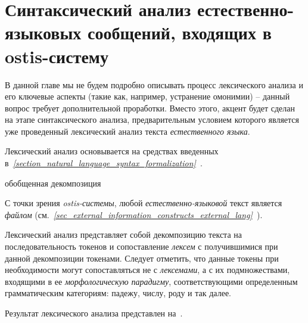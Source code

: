 \section{Синтаксический анализ естественно-языковых сообщений, входящих в ostis-систему}
\label{section_natural_language_messages_syntax_analysis}

В данной главе мы не будем подробно описывать процесс лексического анализа и его ключевые аспекты (такие как, например, устранение омонимии) – данный вопрос требует дополнительной проработки.
Вместо этого, акцент будет сделан на этапе синтаксического анализа, предварительным условием которого является уже проведенный лексический анализ текста \textit{естественного языка}.

Лексический анализ основывается на средствах введенных в~\textit{\ref{section_natural_language_syntax_formalization}~}.

\begin{SCn}

    \begin{scnrelfromset}{обобщенная декомпозиция}
    \end{scnrelfromset}

\end{SCn}

С точки зрения \textit{ostis-системы}, любой \textit{естественно-языковой} текст является \textit{файлом} (см.~\textit{\ref{sec_external_information_constructs_external_lang}~}).

Лексический анализ представляет собой декомпозицию текста на последовательность токенов и сопоставление \textit{лексем} с получившимися при данной декомпозиции токенами.
Следует отметить, что данные токены при необходимости могут сопоставляться не с \textit{лексемами}, а с их подмножествами, входящими в ее \textit{морфологическую парадигму}, соответствующими определенным грамматическим категориям: падежу, числу, роду и так далее.

Результат лексического анализа представлен на~\textit{}.

